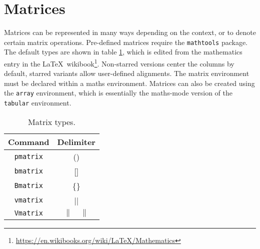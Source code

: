 \section{Matrices}
%
Matrices can be represented in many ways depending on the context, or
to denote certain matrix operations.  Pre-defined matrices require the
\verb|mathtools| package.  The default types are shown in table
\ref{t:mat}, which is edited from the mathematics entry in the
\LaTeX~wikibook\footnote{\url{https://en.wikibooks.org/wiki/LaTeX/Mathematics}}.
Non-starred versions center the columns by default, starred variants
allow user-defined alignments.  The matrix environment must be
declared within a maths environment.  Matrices can also be created
using the \verb|array| environment, which is essentially the
maths-mode version of the \verb|tabular| environment.
\begin{table}[!htbp]
    \centering
    \caption{Matrix types.}
    \label{t:mat}
    \begin{tabular}{cc}
        \toprule
        Command & Delimiter \\
        \midrule
        \verb|pmatrix| & (\quad) \\
        \verb|bmatrix| & [\quad] \\
        \verb|Bmatrix| & \{\quad\} \\
        \verb|vmatrix| & |\quad| \\
        \verb|Vmatrix| & $\|\quad\|$ \\
        \bottomrule
    \end{tabular}
\end{table}
%
